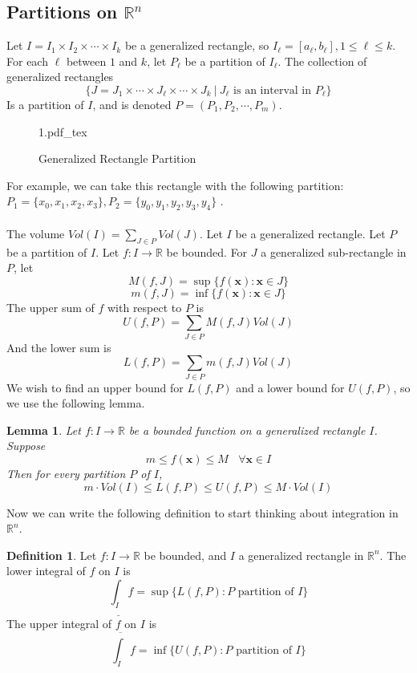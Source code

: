 \documentclass{article}
\newcommand{\incfig}[1]{%
    \def\svgwidth{.5\linewidth}
    {#1.pdf_tex}
}
\newtheorem{lemma}{Lemma}[section]
\theoremstyle{definition}
\newtheorem{definition}{Definition}[section]
\begin{document}
\subsection{Partitions on $\mathbb{R}^n$}
Let $I = I_1 \times I_2 \times \cdots \times I_k$ be a generalized rectangle, so $I_\ell = [a_\ell, b_\ell], 1 \leqslant \ell \leqslant k$.
For each $\ell$ between $1$ and $k$, let $P_\ell$ be a partition of $I_\ell$. The collection of 
generalized rectangles 
\[
    \{ J = J_1 \times \cdots \times J_\ell \times \cdots \times J_k \ | \ J_\ell \text{ is an interval in $P_\ell$}\}
\]
Is a partition of $I$, and is denoted $P = (P_1,P_2, \cdots , P_m)$.
\begin{figure}[ht]
    \centering
    \incfig{1}
    \caption{Generalized Rectangle Partition}
    \label{fig:1}
\end{figure}
For example, we can take this rectangle with the following partition: 
$P_1 = \{x_0,x_1,x_2,x_3\}, P_2 = \{y_0,y_1,y_2,y_3,y_4\}$ .\\\\
The volume $Vol(I) = \sum_{J \in P}Vol(J)$.
    Let $I$ be a generalized rectangle. Let $P$ be a partition of $I$.
    Let $f:I \rightarrow \mathbb{R}$ be bounded. For $J$ a generalized sub-rectangle in $P$,
    let 
    \[
        M(f,J) = \sup\{f(\bm x) : \bm x \in J\}
    \]
    \[
        m(f,J) = \inf\{f(\bm x) : \bm x \in J\}
    \]
    The upper sum of $f$ with respect to $P$ is \[U(f,P) = \sum_{J \in P}M(f,J)Vol(J)\]
    And the lower sum is 
    \[
        L(f,P) = \sum_{J \in P} m(f,J)Vol(J)
    \]
We wish to find an upper bound for $L(f,P)$ and a lower bound for $U(f,P)$, so we use the following lemma.
\begin{mdframed}\begin{lemma}
    Let $f:I \rightarrow \mathbb{R}$ be a bounded function on a generalized rectangle $I$.
    Suppose 
    \[
        m \leqslant f(\bm x) \leqslant M \ \ \ \ \forall \bm x \in I
    \]
    Then for every partition $P$ of $I$,
    \[
        m \cdot Vol(I) \leqslant L(f,P) \leqslant U(f,P) \leqslant M \cdot Vol(I)
    \]
\end{lemma}\end{mdframed}
Now we can write the following definition to start thinking about integration in $\mathbb{R}^n$.
    \begin{definition}
        Let $f: I \rightarrow \mathbb{R}$ be bounded, and $I$ a generalized rectangle in $\mathbb{R}^n$.
        The lower integral of $f$ on $I$ is 
        \[
            \underline{\int_{I}}f = \sup\{L(f,P) : P \text{ partition of } I\}
        \]
        The upper integral of $f$ on $I$ is 
        \[
            \overline{\int_{I}}f = \inf\{U(f,P) : P \text{ partition of } I\}
        \]
    \end{definition}
\end{document}
